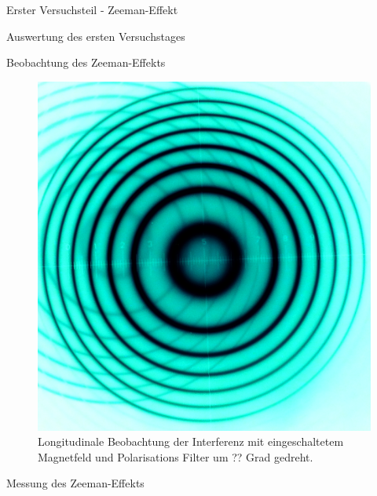 \documentclass[pdftex, a4paper,11pt, twoside, ngerman]{report}
\begin{document}
\begin{chapter}{Erster Versuchsteil - Zeeman-Effekt}
\begin{section}{Auswertung des ersten Versuchstages}
\begin{subsection}{Beobachtung des Zeeman-Effekts}
\begin{figure}[ht]
\begin{minipage}{0.48\textwidth}
            \includegraphics[width=\textwidth]
                {Figures/parallel1inv.png}
            \caption{Longitudinale Beobachtung der Interferenz mit 
                eingeschaltetem Magnetfeld und Polarisations Filter um ?? Grad
                gedreht.}
            \label{fig:para1inv}
          \end{minipage}
        \end{figure}
        
      \end{subsection}
      
      
      
      \begin{subsection}{Messung des Zeeman-Effekts}
        \label{chp:Zeeman:sec:AuswertungMessung}
        

\end{subsection}
\end{section}
\end{chapter}
\end{document}
